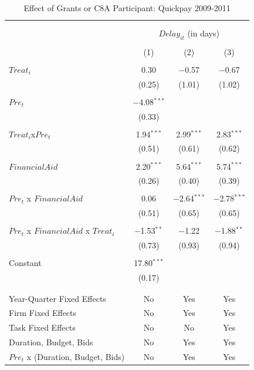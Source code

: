 \documentclass[
]{article}
\begin{document}
\begin{table}[H] \centering 
  \caption{Effect of Grants or C8A Participant: Quickpay 2009-2011} 
  \label{} 
\small 
\begin{tabular}{@{\extracolsep{-2pt}}lccc} 
\\[-1.8ex]\hline 
\hline \\[-1.8ex] 
\\[-1.8ex] & \multicolumn{3}{c}{$Delay_{it}$ (in days)} \\ 
\\[-1.8ex] & (1) & (2) & (3)\\ 
\hline \\[-1.8ex] 
 $Treat_i$ & 0.30 & $-$0.57 & $-$0.67 \\ 
  & (0.25) & (1.01) & (1.02) \\ 
  & & & \\ 
 $Pre_t$ & $-$4.08$^{***}$ &  &  \\ 
  & (0.33) &  &  \\ 
  & & & \\ 
 $Treat_i$x$Pre_t$ & 1.94$^{***}$ & 2.99$^{***}$ & 2.83$^{***}$ \\ 
  & (0.51) & (0.61) & (0.62) \\ 
  & & & \\ 
 $FinancialAid$ & 2.20$^{***}$ & 5.64$^{***}$ & 5.74$^{***}$ \\ 
  & (0.26) & (0.40) & (0.39) \\ 
  & & & \\ 
 $Pre_t$ x $FinancialAid$ & 0.06 & $-$2.64$^{***}$ & $-$2.78$^{***}$ \\ 
  & (0.51) & (0.65) & (0.65) \\ 
  & & & \\ 
 $Pre_t$ x $FinancialAid$ x $Treat_i$ & $-$1.53$^{**}$ & $-$1.22 & $-$1.88$^{**}$ \\ 
  & (0.73) & (0.93) & (0.94) \\ 
  & & & \\ 
 Constant & 17.80$^{***}$ &  &  \\ 
  & (0.17) &  &  \\ 
  & & & \\ 
\hline \\[-1.8ex] 
Year-Quarter Fixed Effects & No & Yes & Yes \\ 
Firm Fixed Effects & No & Yes & Yes \\ 
Task Fixed Effects & No & No & Yes \\ 
Duration, Budget, Bids & No & Yes & Yes \\ 
$Pre_t$  x  (Duration, Budget, Bids) & No & Yes & Yes \\ 

\end{tabular}
\end{table}
\end{document}
